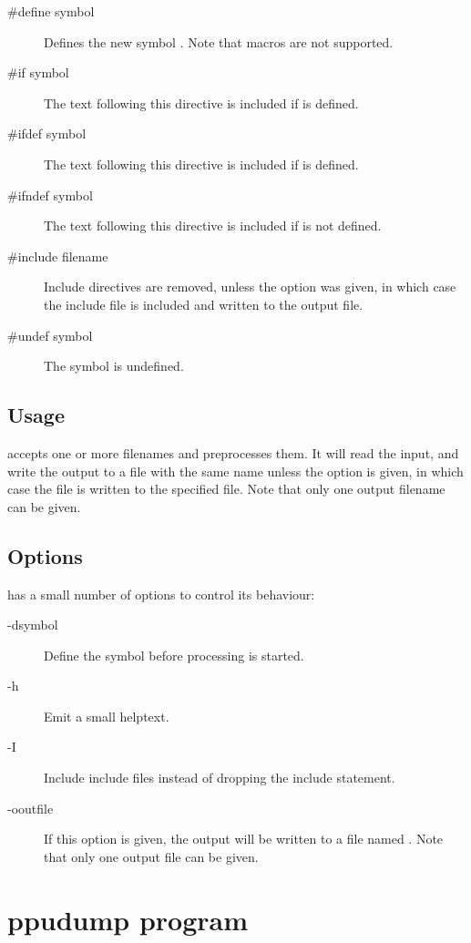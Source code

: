 \begin{description}
\item [\#define symbol] Defines the new symbol . Note that macros are not supported.
\item [\#if symbol] The text following this directive is included if  is defined.
\item [\#ifdef symbol] The text following this directive is included if  is defined. 
\item [\#ifndef symbol] The text following this directive is included if  is not defined.
\item [\#include filename] Include directives are removed, unless the  option was given, 
in which case the include file is included and written to the output file.
\item[\#undef symbol] The symbol  is undefined.
\end{description}

\subsection{Usage}
 accepts one or more filenames and preprocesses them. 
It will read the input, and write the output to a file with the same name 
unless the  option is given, in which case the file is written 
to the specified file. Note that only one output filename can be given.


\subsection{Options}
 has a small number of options to control its behaviour:
\begin{description}
\item[-dsymbol] Define the symbol  before processing is started.
\item[-h] Emit a small helptext.
\item[-I] Include include files instead of dropping the include statement.
\item[-ooutfile] If this option is given, the output will be written to a 
file named . Note that only one output file can be given.
\end{description}

\section{ppudump program}

